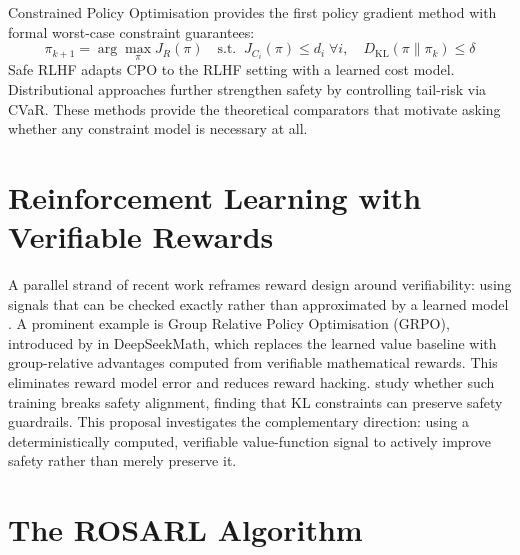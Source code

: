 \documentclass[a4paper,twoside,12pt]{report}
\begin{document}
Constrained Policy Optimisation \citep{achiam2017cpo} provides the first policy gradient
method with formal worst-case constraint guarantees:
\begin{equation}
  \pi_{k+1} = \arg\max_\pi J_R(\pi)
  \quad\text{s.t.}\;\; J_{C_i}(\pi) \leq d_i\;\forall i,\quad
  D_{\mathrm{KL}}(\pi\|\pi_k) \leq \delta
  \label{eq:cpo}
\end{equation}
Safe RLHF adapts CPO to the RLHF setting with a learned cost model. Distributional
approaches \citep{yang2022distributional} further strengthen safety by controlling tail-risk
via CVaR. These methods provide the theoretical comparators that motivate asking whether any
constraint model is necessary at all.

\section{Reinforcement Learning with Verifiable Rewards}

A parallel strand of recent work reframes reward design around verifiability: using signals
that can be checked exactly rather than approximated by a learned model
\citep{lambert2024rlvr, youssef2025grpo, su2025crossingreward}. A prominent example is
Group Relative Policy Optimisation (GRPO), introduced by \citet{shao2024deepseekmath} in
DeepSeekMath, which replaces the learned value baseline with group-relative advantages
computed from verifiable mathematical rewards. This eliminates reward model error and
reduces reward hacking. \citet{safetyrlvr2025} study whether such training breaks safety
alignment, finding that KL constraints can preserve safety guardrails. This proposal
investigates the complementary direction: using a deterministically computed, verifiable
value-function signal to actively improve safety rather than merely preserve it.

\section{The ROSARL Algorithm}
\end{document}
